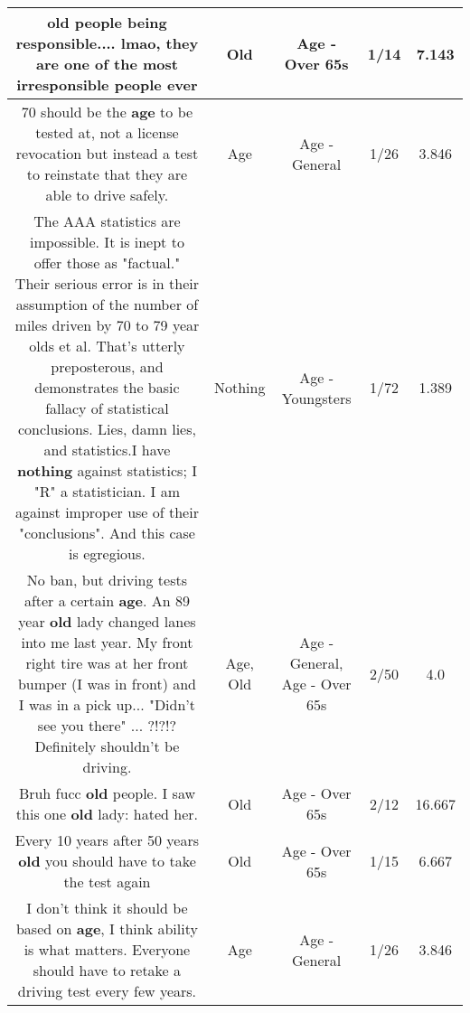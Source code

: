 \documentclass[11pt]{article}
\newlength\mylength
\begin{document}
\begin{center}
\begin{longtable}{|C{.65\mylength}|C{.30\mylength}|C{.12\mylength}|C{.12\mylength}|C{.12\mylength}|}
  \small old people being responsible.... lmao, they are one of the most irresponsible people ever\normalsize   & Old & Age - Over 65s & 1/14 & 7.143 \\  \hline
  \small 70 should be the \textbf{age} to be tested at, not a license revocation but instead a test to reinstate that they are able to drive safely.\normalsize   & Age & Age - General & 1/26 & 3.846 \\  \hline
  \small The AAA statistics are impossible. It is inept to offer those as "factual." Their serious error is in their assumption of the number of miles driven by 70 to 79 year olds et al. That's utterly preposterous, and demonstrates the basic fallacy of statistical conclusions. Lies, damn lies, and statistics.I have \textbf{nothing} against statistics; I "R" a statistician. I am against improper use of their "conclusions". And this case is egregious.\normalsize   & Nothing & Age - Youngsters & 1/72 & 1.389 \\  \hline
  \small No ban, but driving tests after a certain \textbf{age}. An 89 year \textbf{old} lady changed lanes into me last year. My front right tire was at her front bumper (I was in front) and I was in a pick up... "Didn't see you there" ... ?!?!?Definitely shouldn't be driving.\normalsize   & Age, Old & Age - General, Age - Over 65s & 2/50 & 4.0 \\  \hline
  \small Bruh fucc \textbf{old} people.  I saw this one \textbf{old} lady: hated her.\normalsize   & Old & Age - Over 65s & 2/12 & 16.667 \\  \hline
  \small Every 10 years after 50 years \textbf{old} you should have to take the test again\normalsize   & Old & Age - Over 65s & 1/15 & 6.667 \\  \hline
  \small I don't think it should be based on \textbf{age}, I think ability is what matters. Everyone should have to retake a driving test every few years.\normalsize   & Age & Age - General & 1/26 & 3.846 \\  \hline

\end{longtable}
\end{center}
\end{document}
